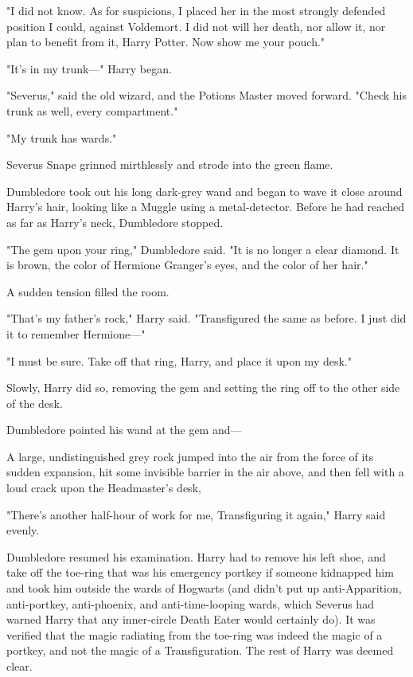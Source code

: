 "I did not know. As for suspicions, I placed her in the most strongly defended 
position I could, against Voldemort. I did not will her death, nor allow it, 
nor plan to benefit from it, Harry Potter. Now show me your pouch."

"It's in my trunk---" Harry began.

"Severus," said the old wizard, and the Potions Master moved forward. "Check 
his trunk as well, every compartment."

"My trunk has wards."

Severus Snape grinned mirthlessly and strode into the green flame.

Dumbledore took out his long dark-grey wand and began to wave it close around 
Harry's hair, looking like a Muggle using a metal-detector. Before he had 
reached as far as Harry's neck, Dumbledore stopped.

"The gem upon your ring," Dumbledore said. "It is no longer a clear diamond. It 
is brown, the color of Hermione Granger's eyes, and the color of her hair."

A sudden tension filled the room.

"That's my father's rock," Harry said. "Transfigured the same as before. I just 
did it to remember Hermione---"

"I must be sure. Take off that ring, Harry, and place it upon my desk."

Slowly, Harry did so, removing the gem and setting the ring off to the other 
side of the desk.

Dumbledore pointed his wand at the gem and---

A large, undistinguished grey rock jumped into the air from the force of its 
sudden expansion, hit some invisible barrier in the air above, and then fell 
with a loud crack upon the Headmaster's desk,

"There's another half-hour of work for me, Transfiguring it again," Harry said 
evenly.

Dumbledore resumed his examination. Harry had to remove his left shoe, and take 
off the toe-ring that was his emergency portkey if someone kidnapped him and 
took him outside the wards of Hogwarts (and didn't put up anti-Apparition, 
anti-portkey, anti-phoenix, and anti-time-looping wards, which Severus had 
warned Harry that any inner-circle Death Eater would certainly do). It was 
verified that the magic radiating from the toe-ring was indeed the magic of a 
portkey, and not the magic of a Transfiguration. The rest of Harry was deemed 
clear.

